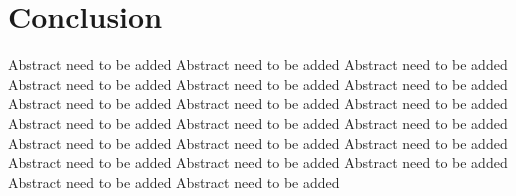 \documentclass[10pt]{article}
\begin{document}
\section{Conclusion}
Abstract need to be added Abstract need to be added Abstract need to be added Abstract need to be added 
Abstract need to be added Abstract need to be added Abstract need to be added Abstract need to be added 
Abstract need to be added Abstract need to be added Abstract need to be added Abstract need to be added 
Abstract need to be added Abstract need to be added Abstract need to be added Abstract need to be added 
Abstract need to be added Abstract need to be added Abstract need to be added Abstract need to be added 

\vspace{1mm}

\footnotesize

\end{document}
